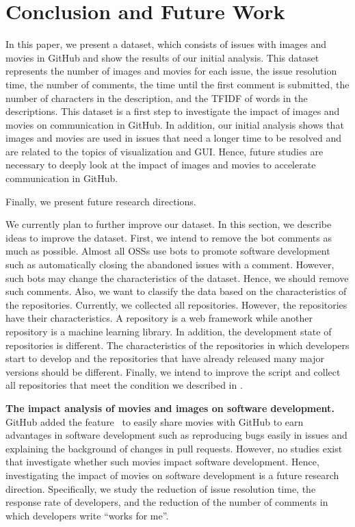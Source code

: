 \section{Conclusion and Future Work}
\label{sec:conclusion}

In this paper, we present a dataset, 
which consists of issues with images and movies 
in GitHub and show the results of our initial analysis. 
This dataset represents the number of images and movies 
for each issue, 
the issue resolution time, 
the number of comments, 
the time until the first comment is submitted, 
the number of characters in the description, 
and the TFIDF of words in the descriptions. 
This dataset is a first step to investigate 
the impact of images and movies on communication in GitHub. 
In addition, our initial analysis shows that images and movies 
are used in issues that need a longer time to be resolved and 
are related to the topics of visualization and GUI. 
Hence, future studies are necessary to deeply look at 
the impact of images and movies to accelerate communication 
in GitHub.

Finally, we present future research directions. 

We currently plan to further improve our dataset. 
In this section, we describe ideas to improve the dataset. 
First, we intend to remove the bot comments as much as 
possible. 
Almost all OSSs use bots to promote software development 
such as automatically closing the abandoned issues with 
a comment. 
However, such bots may change the characteristics of 
the dataset. 
Hence, we should remove such comments. 
Also, we want to classify the data based on 
the characteristics of the repositories. 
Currently, we collected all repositories. 
However, the repositories have their characteristics. 
A repository is a web framework while another repository is 
a machine learning library. 
In addition, the development state of repositories is different. 
The characteristics of the repositories in which 
developers start to develop and the repositories that 
have already released many major versions should be different. 
Finally, we intend to improve the script and 
collect all repositories that meet the condition we described in . 


\noindent
\textbf{The impact analysis of movies and images on software development.}
GitHub added the feature~\citep{github-video-blog} to easily 
share movies with GitHub to earn advantages 
in software development such as reproducing bugs easily in issues and 
explaining the background of changes in pull requests. 
However, no studies exist that investigate whether such movies 
impact software development. 
Hence, investigating the impact of movies on software development 
is a future research direction. 
Specifically, we study the reduction of issue resolution time, 
the response rate of developers, and 
the reduction of the number of comments 
in which developers write ``works for me''. 

